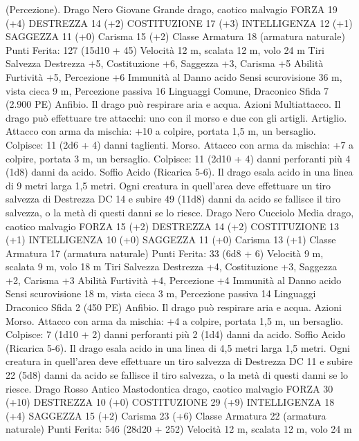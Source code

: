 \begin{multicols}{2}
(Percezione).
Drago Nero Giovane
Grande drago, caotico malvagio
FORZA 19 (+4)
DESTREZZA 14 (+2)
COSTITUZIONE 17 (+3)
INTELLIGENZA 12 (+1)
SAGGEZZA 11 (+0)
Carisma 15 (+2)
Classe Armatura 18 (armatura naturale)
\hspace*{0pt}\hfill{Punti Ferita}: 127 (15d10 + 45)
Velocità 12 m, scalata 12 m, volo 24 m
Tiri Salvezza Destrezza +5, Costituzione +6, Saggezza +3,
Carisma +5
Abilità Furtività +5, Percezione +6
Immunità al Danno acido
Sensi scurovisione 36 m, vista cieca 9 m, Percezione passiva 16
Linguaggi Comune, Draconico
Sfida 7 (2.900 PE)
Anfibio. Il drago può respirare aria e acqua.
Azioni
Multiattacco. Il drago può effettuare tre attacchi: uno con il
morso e due con gli artigli.
Artiglio. Attacco con arma da mischia: +10 a colpire, portata 1,5
m, un bersaglio.
Colpisce: 11 (2d6 + 4) danni taglienti.
Morso. Attacco con arma da mischia: +7 a colpire, portata 3 m,
un bersaglio.
Colpisce: 11 (2d10 + 4) danni perforanti più 4 (1d8) danni da acido.
Soffio Acido (Ricarica 5-6). Il drago esala acido in una linea di 9
metri larga 1,5 metri. Ogni creatura in quell’area deve effettuare un tiro
salvezza di Destrezza DC 14 e subire 49 (11d8) danni da acido se fallisce
il tiro salvezza, o la metà di questi danni se lo riesce.
Drago Nero Cucciolo
Media drago, caotico malvagio
FORZA 15 (+2)
DESTREZZA 14 (+2)
COSTITUZIONE 13 (+1)
INTELLIGENZA 10 (+0)
SAGGEZZA 11 (+0)
Carisma 13 (+1)
Classe Armatura 17 (armatura naturale)
\hspace*{0pt}\hfill{Punti Ferita}: 33 (6d8 + 6)
Velocità 9 m, scalata 9 m, volo 18 m
Tiri Salvezza Destrezza +4, Costituzione +3, Saggezza +2,
Carisma +3
Abilità Furtività +4, Percezione +4
Immunità al Danno acido
Sensi scurovisione 18 m, vista cieca 3 m, Percezione passiva 14
Linguaggi Draconico
Sfida 2 (450 PE)
Anfibio. Il drago può respirare aria e acqua.
Azioni
Morso. Attacco con arma da mischia: +4 a colpire, portata 1,5
m, un bersaglio.
Colpisce: 7 (1d10 + 2) danni perforanti più 2 (1d4) danni da acido.
Soffio Acido (Ricarica 5-6). Il drago esala acido in una linea di
4,5 metri larga 1,5 metri. Ogni creatura in quell’area deve
effettuare un tiro salvezza di Destrezza DC 11 e subire 22 (5d8)
danni da acido se fallisce il tiro salvezza, o la metà di questi
danni se lo riesce.
Drago Rosso Antico
Mastodontica drago, caotico malvagio
FORZA 30 (+10)
DESTREZZA 10 (+0)
COSTITUZIONE 29 (+9)
INTELLIGENZA 18 (+4)
SAGGEZZA 15 (+2)
Carisma 23 (+6)
Classe Armatura 22 (armatura naturale)
\hspace*{0pt}\hfill{Punti Ferita}: 546 (28d20 + 252)
Velocità 12 m, scalata 12 m, volo 24 m

\end{multicols}
